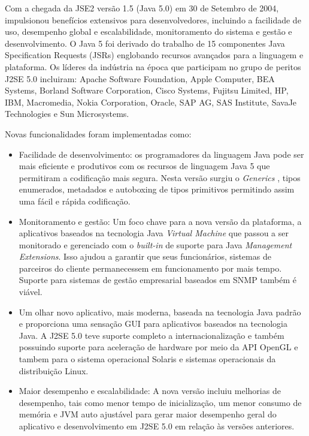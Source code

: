 Com a chegada da \acs{JSE2} versão 1.5 (Java 5.0) em 30 de Setembro de 2004, impulsionou benefícios extensivos para desenvolvedores, incluindo a facilidade de uso, desempenho global e escalabilidade, monitoramento do sistema e gestão e desenvolvimento. O Java 5 foi derivado do trabalho de 15 componentes Java Specification Requests (JSRs) englobando recursos avançados para a linguagem e plataforma. Os líderes da indústria na época que participam no grupo de peritos J2SE 5.0 incluiram: Apache Software Foundation, Apple Computer, BEA Systems, Borland Software Corporation, Cisco Systems, Fujitsu Limited, HP, IBM, Macromedia, Nokia Corporation, Oracle, SAP AG, SAS Institute, SavaJe Technologies e Sun Microsystems.

Novas funcionalidades foram implementadas como:

\begin{itemize}
  \item Facilidade de desenvolvimento: os programadores da linguagem Java pode ser mais eficiente e produtivos com os recursos de linguagem Java 5 que permitiram a codificação mais segura. Nesta versão surgiu o {\it Generics} \cite{OracleGenerics,Bracha:1998:MFS:286942.286957}, tipos enumerados, metadados e autoboxing de tipos primitivos permitindo assim uma fácil e rápida codificação.
  \item Monitoramento e gestão: Um foco chave para a nova versão da plataforma, a aplicativos baseados na tecnologia Java {\it Virtual Machine} que passou a ser monitorado e gerenciado com o {\it built-in} de suporte para Java {\it Management Extensions}. Isso ajudou a garantir que seus funcionários, sistemas de parceiros do cliente permanecessem em funcionamento por mais tempo. Suporte para sistemas de gestão empresarial baseados em SNMP também é viável.
  \item Um olhar novo aplicativo, mais moderna, baseada na tecnologia Java padrão e proporciona uma sensação GUI para aplicativos baseados na tecnologia Java. A J2SE 5.0 teve suporte completo a internacionalização e também possuindo suporte para aceleração de hardware por meio da API OpenGL e tambem para o sistema operacional Solaris e sistemas operacionais da distribuição Linux.
  \item Maior desempenho e escalabilidade: A nova versão incluiu melhorias de desempenho, tais como menor tempo de inicialização, um menor consumo de memória e JVM auto ajustável para gerar maior desempenho geral do aplicativo e desenvolvimento em J2SE 5.0 em relação às versões anteriores.\\
\end{itemize}

